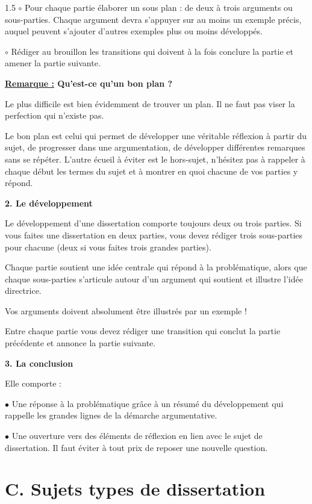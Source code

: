 \documentclass[12pt]{article}
\begin{document}
\begin{spacing}{1.5}
$\circ$ Pour chaque partie élaborer un sous plan : de deux à trois arguments ou sous-parties. Chaque 
argument devra s'appuyer sur au moins un exemple précis, auquel peuvent s'ajouter d'autres exemples plus ou moins développés. 

$\circ$ Rédiger au brouillon les transitions qui doivent à la fois conclure la partie et amener la partie suivante. 

\quad 
\textbf{\underline{ Remarque :} Qu'est-ce qu'un bon plan ?}
 
\quad Le plus difficile est bien évidemment de trouver un plan. Il ne faut pas viser la perfection qui n'existe pas. 

\quad Le bon plan est celui qui permet de développer une véritable réflexion à partir du sujet, de progresser dans une argumentation, de développer différentes remarques sans se répéter. L'autre écueil à éviter est le hors-sujet, n'hésitez pas à rappeler à chaque début les termes du sujet et à 
montrer en quoi chacune de vos parties y répond.


\quad
\quad
\textbf{2. Le développement}

Le développement d'une dissertation comporte toujours deux ou trois parties. Si vous faites une dissertation en deux parties, vous devez rédiger trois sous-parties pour chacune (deux si vous faites trois grandes parties).

Chaque partie soutient une idée centrale qui répond à la problématique, alors que chaque sous-parties s'articule autour d'un argument qui soutient et illustre l'idée directrice.

Vos arguments doivent absolument être illustrés par un exemple !

Entre chaque partie vous devez rédiger une transition qui conclut la partie précédente et annonce la partie suivante.


\textbf{3. La conclusion}

Elle comporte :
 
$\bullet$ Une réponse à la problématique grâce à un résumé du développement qui rappelle les grandes lignes de la démarche argumentative. 

$\bullet$ Une ouverture vers des éléments de réflexion en lien avec le sujet de dissertation. Il faut éviter à tout prix de reposer une nouvelle question.




\section*{C. Sujets types de dissertation}


\end{spacing}
\end{document}
